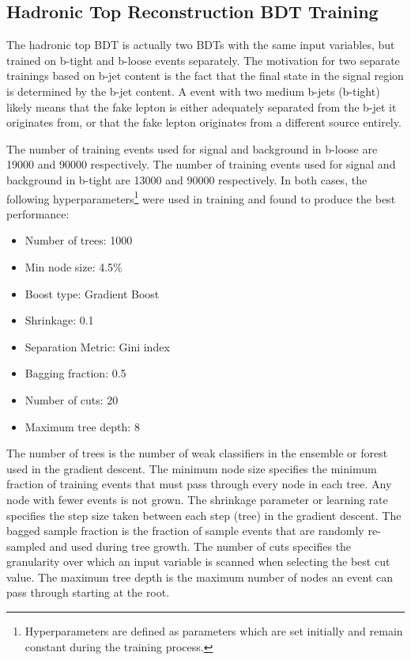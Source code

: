 \subsection{Hadronic Top Reconstruction BDT Training}
The hadronic top BDT is actually two BDTs with the same input variables, but trained on b-tight and b-loose events separately. The motivation for two separate trainings based on b-jet
content is the fact that the \ttbar final state in the signal region is determined by the b-jet content. A \ttbar event with two medium b-jets (b-tight) likely means that the fake lepton is either
adequately separated from the b-jet it originates from, or that the fake lepton originates from a different source entirely.

The number of training events used for signal and background in b-loose are 19000 and 90000 respectively.
The number of training events used for signal and background in b-tight are 13000 and 90000 respectively.
In both cases, the following hyperparameters\footnote{Hyperparameters are defined as parameters which are set initially and remain constant during the training process.}
were used in training and found to produce the best performance:

\begin{itemize}
\item Number of trees: 1000
\item Min node size: 4.5$\%$
\item Boost type: Gradient Boost
\item Shrinkage: 0.1
\item Separation Metric: Gini index
\item Bagging fraction: 0.5
\item Number of cuts: 20
\item Maximum tree depth: 8
\end{itemize}

\noindent The number of trees is the number of weak classifiers in the ensemble or forest used in the gradient descent. The minimum node size specifies the minimum fraction of training events that must pass
through every node in each tree. Any node with fewer events is not grown. The shrinkage parameter or learning rate specifies the step size taken between each step (tree) in the gradient descent.
The bagged sample fraction is the fraction of sample events that are randomly re-sampled and used during tree growth. The number of cuts specifies the granularity over which an input variable is scanned
when selecting the best cut value. The maximum tree depth is the maximum number of nodes an event can pass through starting at the root. 

